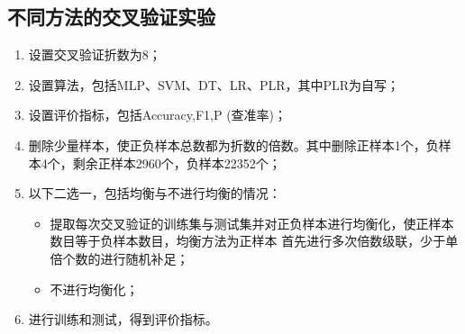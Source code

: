 \documentclass{acm_proc_article-sp}
\begin{document}
\subsection{\textsf{不同方法的交叉验证实验}}
\begin{enumerate}\setlength\itemsep{0mm} 
       \item  设置交叉验证折数为8；
       \item  设置算法，包括MLP、SVM、DT、LR、PLR，其中PLR为自写；
       \item  设置评价指标，包括Accuracy,F1,P (查准率)；
       \item  删除少量样本，使正负样本总数都为折数的倍数。其中删除正样本1个，负样本4个，剩余正样本2960个，负样本22352个；
       \item  以下二选一，包括均衡与不进行均衡的情况：
       \begin{itemize}\setlength\itemsep{0mm} 
              \item 提取每次交叉验证的训练集与测试集并对正负样本进行均衡化，使正样本数目等于负样本数目，均衡方法为正样本
              首先进行多次倍数级联，少于单倍个数的进行随机补足；
              \item 不进行均衡化；
       \end{itemize}
       \item  进行训练和测试，得到评价指标。
\end{enumerate}
\end{document}
